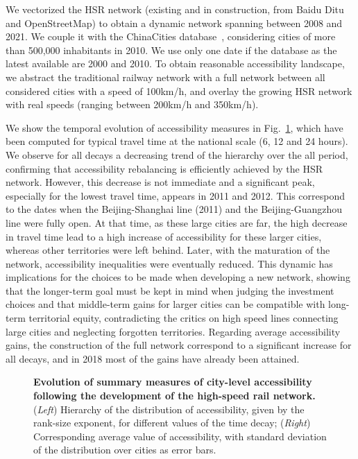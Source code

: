 We vectorized the HSR network (existing and in construction, from Baidu Ditu and OpenStreetMap) to obtain a dynamic network spanning between 2008 and 2021. We couple it with the ChinaCities database~\citep{swerts2017database}, considering cities of more than 500,000 inhabitants in 2010. We use only one date if the database as the latest available are 2000 and 2010. To obtain reasonable accessibility landscape, we abstract the traditional railway network with a full network between all considered cities with a speed of 100km/h, and overlay the growing HSR network with real speeds (ranging between 200km/h and 350km/h).

We show the temporal evolution of accessibility measures in Fig.~\ref{fig:hsraccess}, which have been computed for typical travel time at the national scale (6, 12 and 24 hours). We observe for all decays a decreasing trend of the hierarchy over the all period, confirming that accessibility rebalancing is efficiently achieved by the HSR network. However, this decrease is not immediate and a significant peak, especially for the lowest travel time, appears in 2011 and 2012. This correspond to the dates when the Beijing-Shanghai line (2011) and the Beijing-Guangzhou line were fully open. At that time, as these large cities are far, the high decrease in travel time lead to a high increase of accessibility for these larger cities, whereas other territories were left behind. Later, with the maturation of the network, accessibility inequalities were eventually reduced. This dynamic has implications for the choices to be made when developing a new network, showing that the longer-term goal must be kept in mind when judging the investment choices and that middle-term gains for larger cities can be compatible with long-term territorial equity, contradicting the critics on high speed lines connecting large cities and neglecting forgotten territories. Regarding average accessibility gains, the construction of the full network correspond to a significant increase for all decays, and in 2018 most of the gains have already been attained.


\begin{figure}
	\caption{\textbf{Evolution of summary measures of city-level accessibility following the development of the high-speed rail network.} (\textit{Left}) Hierarchy of the distribution of accessibility, given by the rank-size exponent, for different values of the time decay; (\textit{Right}) Corresponding average value of accessibility, with standard deviation of the distribution over cities as error bars.\label{fig:hsraccess}}
\end{figure}

